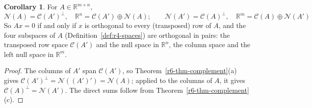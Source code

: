 \documentclass[12pt]{article}
\newcommand{\R}{\mathbb R}
\theoremstyle{definition}
\newtheorem{corollary}[theorem]{Corollary}
\begin{document}
\begin{corollary}\label{r6-cor-four-subspaces}
For \(A\in\R^{m\times n}\),
\[
\mathcal N(A)=\mathcal C(A')^\perp,\quad \R^n=\mathcal C(A')\oplus\mathcal N(A);\qquad
\mathcal N(A')=\mathcal C(A)^\perp,\quad \R^m=\mathcal C(A)\oplus\mathcal N(A')
\]
So \(Ax=0\) if and only if \(x\) is orthogonal to every (transposed) row of \(A\), and the four
subspaces of \(A\) (Definition~\ref{def:r4-spaces}) are orthogonal in pairs: the transposed row space \(\mathcal C(A')\) and
the null space in \(\R^n\), the column space and the left null space in \(\R^m\).
\end{corollary}
\begin{proof}
The columns of \(A'\) span \(\mathcal C(A')\), so Theorem~\ref{r6-thm-complement}(a) gives
\(\mathcal C(A')^\perp=\mathcal N((A')')=\mathcal N(A)\); applied to the columns of \(A\), it gives
\(\mathcal C(A)^\perp=\mathcal N(A')\). The direct sums follow from
Theorem~\ref{r6-thm-complement}(c).
\end{proof}
\end{document}
